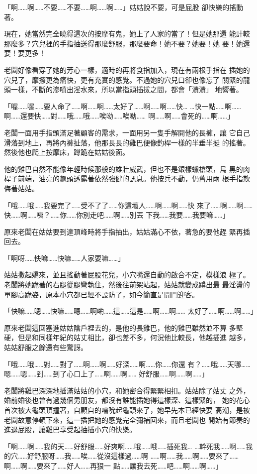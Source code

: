 「啊……啊……不要……不要……啊……啊……」姑姑說不要，可是屁股
卻快樂的搖動著。

現在，她當然完全曉得這次的按摩有鬼，她上了人家的當了！但是她那還
能計較那麼多？穴兒裡的手指抽送得那麼舒服，那麼要命！她不要？她要！她
要！她還要！要更多！

老闆好像看穿了她的芳心一樣，適時的再將食指加入，現在有兩根手指在
插她的穴兒了，摩擦更為痛快，更有充實的感覺。不過她的穴兒口卻也像忘了
關緊的龍頭一樣，不斷的滲噴出淫水來，所以當指頭插拔之間，都會「漬漬」
地響著。

「喔……喔……要人命了……啊……啊……太好了……啊……啊……快…
…快一點……啊……啊……還要快……對……哦……哦……唉呦……唉呦……
啊……啊……會死的……啊……」

老闆一面用手指頭滿足著顧客的需求，一面用另一隻手解開他的長褲，讓
它自己滑落到地上，再將內褲扯落，他那長長的雞巴便像釣桿一樣的半垂半挺
的搖著。然後他也爬上按摩床，蹲跪在姑姑後面。

他的雞巴自然不能像年輕時候那般的雄壯威武，但也不是銀樣蠟槍頭，烏
黑的肉桿子前端，油亮的龜頭透露著依然強健的訊息。他按兵不動，仍舊用兩
根手指欺侮著姑姑。

「哦……哦……我要完了……受不了了……你這壞人……啊……啊……快
來了……啊……啊……快……啊……咦？……你……你別走吧……啊……別丟
下我……我要……我要嘛……」

原來老闆在姑姑要到達頂峰時將手指抽出，姑姑滿心不依，著急的要他趕
緊再插回去。

「啊呀……快嘛……快嘛……人家要嘛……」

姑姑撒起嬌來，並且搖動著屁股花兒，小穴嘴還自動的啟合不定，模樣浪
極了。老闆將她跪著的右腿從腿彎執住，然後往前架站起，姑姑就變成蹲出最
最淫盪的單腳高跪姿，原本小穴都已經不設防了，如今簡直是開門迎客。

「快嘛……嗯……快嘛……嗯……啊喲……這……這是……啊……啊……
太好了……啊……啊……」

原來老闆這回塞進姑姑陰戶裡去的，是他的長雞巴，他的雞巴雖然並不算
多堅硬，但是和同樣年紀的姑丈相比，卻也差不多，何況他比較長，他越插進
越多，姑姑舒服之餘還有些驚訝。

「哦……哦……對……對了……啊……啊……好深……啊……你……你還
有？……哦……天哪……嗯……嗯……到……到了心口上了……啊……啊……
好舒服……啊……啊……」

老闆將雞巴深深地插滿姑姑的小穴，和她密合得緊緊相扣。姑姑除了姑丈
之外，婚前婚後也曾有過幾個男朋友，都沒有誰能插她得這樣深、這樣緊的，
她的花心首次被大龜頭頂撞著，自顧自的嚅吮起龜頭來了，她早先本已經快要
高潮，是被老闆故意停頓下來，這一插把她的感覺完全彌補回來，而且老闆也
開始有節奏的進退屁股，讓雞巴享受起抽插小穴的快樂。

「啊……啊……我的天……好舒服……好爽啊……哦……哦……插死我…
…幹死我……啊……我的穴……好舒服呀……我……唉……從沒這樣過……啊
……啊……我……啊……要來了……啊……啊……要來了……好人……再狠一
點……讓我去死……吧……啊……啊……」

